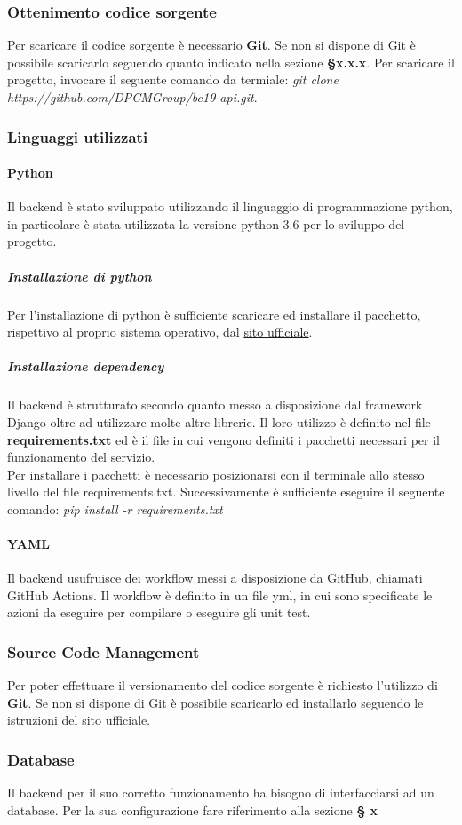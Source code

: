 \subsubsection{Ottenimento codice sorgente}
Per scaricare il codice sorgente è necessario \textbf{Git}. Se non si dispone di Git è possibile scaricarlo seguendo quanto indicato nella sezione \textbf{§x.x.x}. Per scaricare il progetto, invocare il seguente comando da termiale: \textit{git clone https://github.com/DPCMGroup/bc19-api.git}.

\subsubsection{Linguaggi utilizzati}
\paragraph{Python}
Il backend è stato sviluppato utilizzando il linguaggio di programmazione python, in particolare è stata utilizzata la versione python 3.6 per lo sviluppo del progetto.

\subparagraph{Installazione di python}
Per l'installazione di python è sufficiente scaricare ed installare il pacchetto, rispettivo al proprio sistema operativo, dal \href{https://www.python.org/downloads/}{sito ufficiale}.

\subparagraph{Installazione dependency}
Il backend è strutturato secondo quanto messo a disposizione dal framework Django oltre ad utilizzare molte altre librerie. Il loro utilizzo è definito nel file \textbf{requirements.txt} ed è il file in cui vengono definiti i pacchetti necessari per il funzionamento del servizio.\\
Per installare i pacchetti è necessario posizionarsi con il terminale allo stesso livello del file requirements.txt. Successivamente è sufficiente eseguire il seguente comando: \textit{pip install -r requirements.txt}

\paragraph{YAML}
Il backend usufruisce dei workflow messi a disposizione da GitHub, chiamati GitHub Actions. Il workflow è definito in un file yml, in cui sono specificate le azioni da eseguire per compilare o eseguire gli unit test.

\subsubsection{Source Code Management}
Per poter effettuare il versionamento del codice sorgente è richiesto l'utilizzo di \textbf{Git}. Se non si dispone di Git è possibile scaricarlo ed installarlo seguendo le istruzioni del \href{https://git-scm.com/downloads}{sito ufficiale}.

\subsubsection{Database}
Il backend per il suo corretto funzionamento ha bisogno di interfacciarsi ad un database. Per la sua configurazione fare riferimento alla sezione \textbf{§ x}